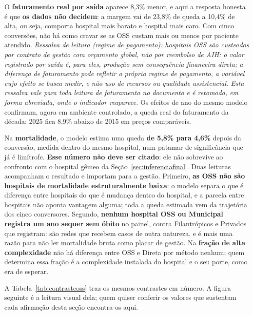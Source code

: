 O \textbf{faturamento real por saída} aparece 8,3\% menor, e aqui a
resposta honesta é que \textbf{os dados não decidem}: a margem vai de
23,8\% de queda a 10,4\% de alta, ou seja, comporta hospital mais barato e
hospital mais caro. Com cinco conversões, não há como cravar se as OSS
custam mais ou menos por paciente atendido. \textit{\label{ressalva:pagamento}Ressalva de leitura (regime de pagamento): hospitais OSS são custeados por contrato de gestão com orçamento global, não por reembolso de AIH: o valor registrado por saída é, para eles, produção sem consequência financeira direta; a diferença de faturamento pode refletir o próprio regime de pagamento, a variável cujo efeito se busca medir, e não uso de recursos ou qualidade assistencial. Esta ressalva vale para toda leitura de faturamento no documento e é retomada, em forma abreviada, onde o indicador reaparece.} Os efeitos de ano do mesmo modelo confirmam, agora em
ambiente controlado, a queda real do faturamento da década: 2025 fica 8,9\%
abaixo de 2015 em preços comparáveis.

Na \textbf{mortalidade}, o modelo estima uma queda \textbf{de 5,8\% para
4,6\%} depois da conversão, medida dentro do mesmo hospital, num
patamar de significância que já é limítrofe. \textbf{Esse número não deve
ser citado}: ele não sobrevive ao confronto com o hospital gêmeo da
Seção~\ref{sec:inferenciafinal}. Duas leituras acompanham o resultado e
importam para a gestão. Primeiro, \textbf{as OSS não são hospitais de
mortalidade estruturalmente baixa}: o modelo separa o que é diferença
entre hospitais do que é mudança dentro do hospital, e a parcela entre
hospitais não aponta vantagem alguma; toda a queda estimada vem da
trajetória dos cinco conversores. Segundo, \textbf{nenhum hospital OSS ou
Municipal registra um ano sequer sem óbito} no painel, contra
Filantrópicos e Privados que registram: são redes que recebem casos de
outra natureza, e é mais uma razão para não ler mortalidade bruta como
placar de gestão. Na \textbf{fração de alta complexidade} não há diferença
entre OSS e Direta por método nenhum; quem determina essa fração é a
complexidade instalada do hospital e o seu porte, como era de esperar.

A Tabela~\ref{tab:contrasteoss} traz os mesmos contrastes em número. A
figura seguinte é a leitura visual dela; quem quiser conferir os valores
que sustentam cada afirmação desta seção encontra-os aqui.

